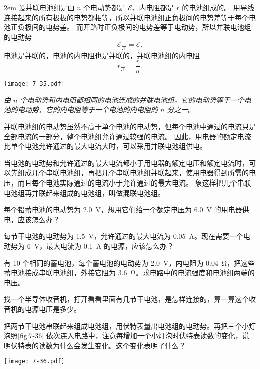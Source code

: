 \medskip\noindent
\begin{minipage}{0.65\linewidth}\parindent2em
设并联电池组是由 $n$ 个电动势都是 $\mathcal{E}$、内电阻都是 $r$ 的电池组成的。
用导线连接起来的所有极板的电势都相等，所以并联电池组正负极间的电势差等于每个电池正负极间的电势差。
而开路时正负极间的电势差等于电动势，所以并联电池组的电动势
\[\mathcal{E}_{\text{并}}=\mathcal{E}.\]
电池是并联的，电池的内电阻也是并联的，并联电池组的内电阻
\[r_{\text{并}}=\frac{r}{n}.\]
\end{minipage}\hfill
\begin{minipage}{0.32\linewidth}\centering
  \begin{figurehere}
    \texttt{[image: 7-35.pdf]}
    \caption{}\label{fig:7-35}
  \end{figurehere}
\end{minipage}

\medskip
\emph{由 $n$ 个电动势和内电阻都相同的电池连成的并联电池组，它的电动势等于一个电池的电动势，它的内电阻等于一个电池的内电阻的 $n$ 分之一}。

并联电池组的电动势虽然不高于单个电池的电动势，但每个电池中通过的电流只是全部电流的一部分，整个电池组允许通过较强的电流。
因此，用电器的额定电流比单个电池允许通过的最大电流大时，可以采用并联电池组供电。

当电池的电动势和允许通过的最大电流都小于用电器的额定电压和额定电流时，可以先组成几个串联电池组，再把几个串联电池组并联起来，使用电器得到所需的电压，而且每个电池实际通过的电流小于允许通过的最大电流。
象这样把几个串联电池组再并联起来组成的电池组，叫做混联电池组。


\begin{Practice}
\begin{question}
  \item 每个铅蓄电池的电动势为 \qty{2.0}{V}，想用它们给一个额定电压为 \qty{6.0}{V} 的用电器供电，应该怎么办？
  \item 每节干电池的电动势为 \qty{1.5}{V}，允许通过的最大电流为 \qty{0.05}{A}。现在需要一个电动势为 \qty{6}{V}，最大电流为 \qty{0.1}{A} 的电源，应该怎么办？
  \item 有 10 个相同的蓄电池，每个蓄电池的电动势为 \qty{2.0}{V}，内电阻为 \qty{0.04}{\ohm}，把这些蓄电池接成串联电池组，外接它阻为 \qty{3.6}{\ohm}。求电路中的电流强度和电池组两端的电压。
  \item 找一个半导体收音机，打开看看里面有几节干电池，是怎样连接的，算一算这个收音机的电源电压是多少。
  \item 把两节干电池串联起来组成电池组，用伏特表量出电池组的电动势。再把三个小灯泡照\cref{fig:7-36} 依次连入电路中，注意每增加一个小灯泡时伏特表读数的变化，说明伏特表的读数为什么会发生变化。这个变化表明了什么？
  \begin{figurehere}
    \begin{minipage}{\linewidth}\centering
      \texttt{[image: 7-36.pdf]}
      \caption{}\label{fig:7-36}
    \end{minipage}
  \end{figurehere}	
\end{question}
\end{Practice}

